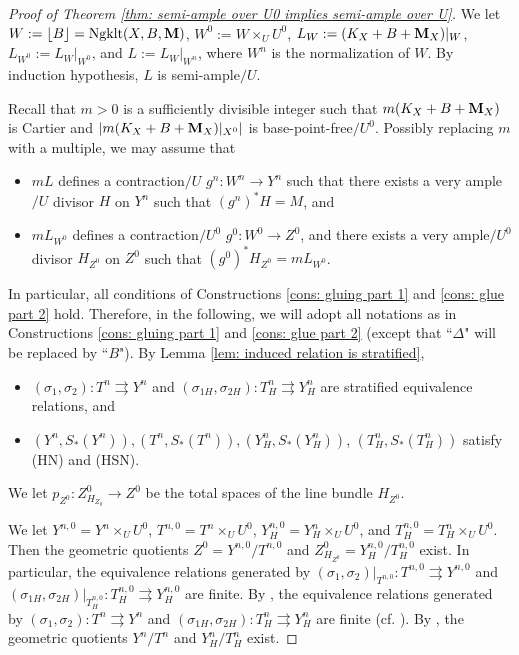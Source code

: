 \documentclass[11pt]{amsart}
\numberwithin{equation}{section}
\newcommand{\Mm}{{\bf{M}}}
\newcommand{\Ngklt}{\operatorname{Ngklt}}
\newcommand{\lf}{\lfloor}
\newcommand{\rf}{\rfloor}
\theoremstyle{definition}
\theoremstyle{definition}
\theoremstyle{definition}
\begin{document}
\begin{proof}[Proof of Theorem \ref{thm: semi-ample over U0 implies
  semi-ample over U}]
  \smallskip

  We let $W:=\lf B\rf=\Ngklt(X,B,\Mm)$, $W^0:=W\times_UU^0$,
  $L_W:=(K_X+B+\Mm_X)|_W$,  $L_{W^0}:=L_W|_{W^0}$, and
  $L:=L_W|_{W^n}$, where $W^n$ is the normalization of $W$. By
  induction hypothesis, $L$ is semi-ample$/U$.

  Recall that $m>0$ is a sufficiently divisible integer such that
  $m(K_X+B+\Mm_X)$ is Cartier and $|m(K_X+B+\Mm_X)|_{X^0}|$ is
  base-point-free$/U^0$. Possibly replacing $m$ with a multiple, we
  may assume that
  \begin{itemize}
    \item $mL$ defines a contraction$/U$ $g^n: W^n\rightarrow Y^n$
      such that there exists a very ample$/U$ divisor $H$ on $Y^n$
      such that $(g^n)^*H=M$, and
    \item $mL_{W^0}$ defines a contraction$/U^0$ $g^0: W^0\rightarrow
      Z^0$, and there exists a very ample$/U^0$ divisor $H_{Z^0}$ on
      $Z^0$ such that $(g^0)^*H_{Z^0}=mL_{W^0}$.
  \end{itemize}
  In particular, all conditions of Constructions \ref{cons: gluing
  part 1} and \ref{cons: glue part 2} hold. Therefore, in the
  following, we will adopt all notations as in Constructions
  \ref{cons: gluing part 1} and \ref{cons: glue part 2} (except that
  ``$\Delta$" will be replaced by ``$B$"). By Lemma \ref{lem: induced
  relation is stratified},
  \begin{itemize}
    \item $(\sigma_1,\sigma_2):T^n\rightrightarrows Y^n$ and
      $(\sigma_{1H},\sigma_{2H}):T^n_H\rightrightarrows Y^n_H$ are
      stratified equivalence relations, and
    \item  $(Y^n,S_*(Y^n)),(T^n,S_*(T^n)),(Y^n_H,S_*(Y^n_H))$,
      $(T^n_H,S_*(T^n_H))$ satisfy (HN) and (HSN).
  \end{itemize}
  We let  $p_{Z^0}: Z^0_{H_{Z_0}}\rightarrow Z^0$ be the total spaces
  of the line bundle $H_{Z^0}$.

  We let $Y^{n,0}=Y^n\times_UU^0$, $T^{n,0}=T^n\times_UU^0$,
  $Y^{n,0}_H=Y^n_H\times_UU^0$, and $T^{n,0}_H=T^n_H\times_UU^0$.
  Then the geometric quotients $Z^0=Y^{n,0}/T^{n,0}$ and
  $Z^0_{H_{Z^0}}=Y^{n,0}_H/T^{n,0}_{H}$ exist. In particular, the
  equivalence relations generated by $(\sigma_1,\sigma_2)|_{T^{n,0}}:
  T^{n,0}\rightrightarrows Y^{n,0}$ and
  $(\sigma_{1H},\sigma_{2H})|_{T^{n,0}_H}: T^{n,0}_H\rightrightarrows
  Y^{n,0}_H$ are finite. By \cite[Lemma 9.55]{Kol13}, the equivalence
  relations generated by $(\sigma_1,\sigma_2):T^n\rightrightarrows
  Y^n$ and $(\sigma_{1H},\sigma_{2H}):T^n_H\rightrightarrows Y^n_H$
  are finite (cf. \cite[Proposition 3.12]{HX13}). By \cite[Theorem
  9.21]{Kol13}, the geometric quotients $Y^n/T^n$ and $Y^n_H/T^n_H$ exist.


\end{proof}
\end{document}

